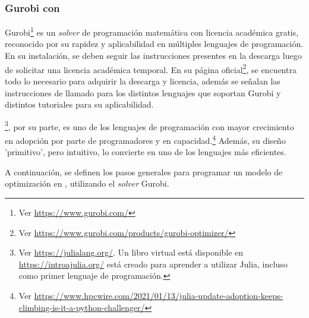 \subsubsection{Gurobi con \julia}\label{mtjulia}

Gurobi\footnote{Ver \url{https://www.gurobi.com/}} es un \textit{solver} de programación matemática con licencia académica gratis, reconocido por su rapidez y aplicabilidad en múltiples lenguajes de programación. En su instalación, se deben seguir las instrucciones presentes en la descarga luego de solicitar una licencia académica temporal. En su página oficial\footnote{Ver  \url{https://www.gurobi.com/products/gurobi-optimizer/}}, se encuentra todo lo necesario para adquirir la descarga y licencia, además se señalan las instrucciones de llamado para los distintos lenguajes que soportan Gurobi y distintos tutoriales para su aplicabilidad.
\vspace{2.5mm}

\julia\footnote{Ver \url{https://julialang.org/}. Un libro virtual está disponible en \url{https://introajulia.org/} está creado para aprender a utilizar Julia, incluso como primer lenguaje de programación.}, por su parte, es uno de los lenguajes de programación con mayor crecimiento en adopción por parte de programadores y en capacidad.\footnote{Ver {\tiny \url{ https://www.hpcwire.com/2021/01/13/julia-update-adoption-keeps-climbing-is-it-a-python-challenger/}}} Además, su diseño 'primitivo', pero intuitivo, lo convierte en uno de los lenguajes más eficientes. 
\vspace{2.5mm}

A continuación, se definen los pasos generales para programar un modelo de optimización en \julia, utilizando el \textit{solver} Gurobi. 


